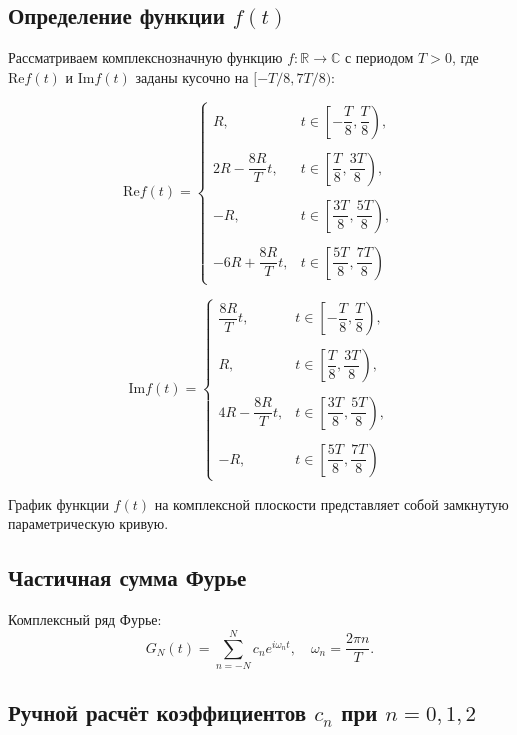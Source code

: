 \subsection*{Определение функции $f(t)$}

Рассматриваем комплекснозначную функцию $f: \mathbb{R} \rightarrow \mathbb{C}$ с периодом $T > 0$, где $\text{Re} f(t)$ и $\text{Im} f(t)$ заданы кусочно на $[-T/8, 7T/8)$:

\[
\text{Re} f(t) =
\begin{cases}
R, & t \in \left[ -\dfrac{T}{8}, \dfrac{T}{8} \right), \\\\
2R - \dfrac{8R}{T} t, & t \in \left[ \dfrac{T}{8}, \dfrac{3T}{8} \right), \\\\
- R, & t \in \left[ \dfrac{3T}{8}, \dfrac{5T}{8} \right), \\\\
-6R + \dfrac{8R}{T} t, & t \in \left[ \dfrac{5T}{8}, \dfrac{7T}{8} \right)
\end{cases}
\]

\[
\text{Im} f(t) =
\begin{cases}
\dfrac{8R}{T} t, & t \in \left[ -\dfrac{T}{8}, \dfrac{T}{8} \right), \\\\
R, & t \in \left[ \dfrac{T}{8}, \dfrac{3T}{8} \right), \\\\
4R - \dfrac{8R}{T} t, & t \in \left[ \dfrac{3T}{8}, \dfrac{5T}{8} \right), \\\\
- R, & t \in \left[ \dfrac{5T}{8}, \dfrac{7T}{8} \right)
\end{cases}
\]

График функции $f(t)$ на комплексной плоскости представляет собой замкнутую параметрическую кривую.

\subsection*{Частичная сумма Фурье}

Комплексный ряд Фурье:
\[
G_N(t) = \sum_{n=-N}^{N} c_n e^{i \omega_n t}, \quad \omega_n = \frac{2\pi n}{T}.
\]

\subsection*{Ручной расчёт коэффициентов $c_n$ при $n = 0, 1, 2$}

